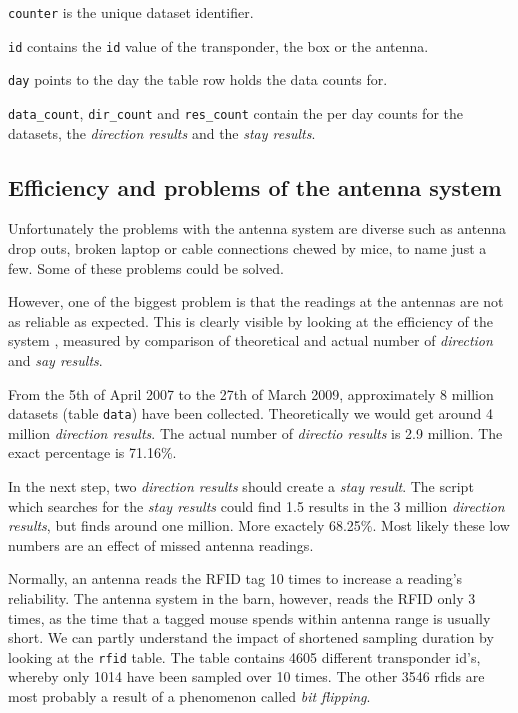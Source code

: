 \begin{mydesc}
\item \lstinline|counter| is the unique dataset identifier.
\item \lstinline|id| contains the \lstinline|id| value of the transponder, the box or the antenna.
\item \lstinline|day| points to the day the table row holds the data counts for.
\item \lstinline|data_count|, \lstinline|dir_count| and \lstinline|res_count| contain the per day counts for the datasets, the \textit{direction results} and the \textit{stay results}.
\end{mydesc}

\subsection{Efficiency and problems of the antenna system}
\label{subsec:problems}

Unfortunately the problems with the antenna system are diverse such as antenna drop outs, broken laptop or cable connections chewed by mice, to name just a few. Some of these problems could be solved.

However, one of the biggest problem is that the readings at the antennas are not as reliable as expected. This is clearly visible by looking at the efficiency of the system , measured by comparison of theoretical and actual number of \textit{direction} and \textit{say results}. 

From the 5th of April 2007 to the 27th of March 2009, approximately 8 million datasets (table \lstinline|data|)  
have been collected. Theoretically we would get around 4 million \textit{direction results}. The actual number of \textit{directio  results} is 2.9 million. The exact percentage is 71.16\%.

In the next step, two \textit{direction results} should create a \textit{stay result}. The script which searches for the \textit{stay results} could find 1.5  results in the 3 million \textit{direction results}, but finds around one million. More exactely  68.25\%. Most likely these low numbers are an effect of missed antenna readings.
 
Normally, an antenna reads the RFID tag 10 times to increase a reading's reliability. The antenna system in the barn, however, reads the RFID only 3 times, as the time that a tagged mouse spends within antenna range is usually short. We can partly understand the impact of shortened sampling duration by looking at the \lstinline|rfid| table. The table contains 4605 different transponder id's, whereby only 1014 have been sampled over 10 times. The other 3546 rfids are most probably a result of a phenomenon called \textit{bit flipping}.

